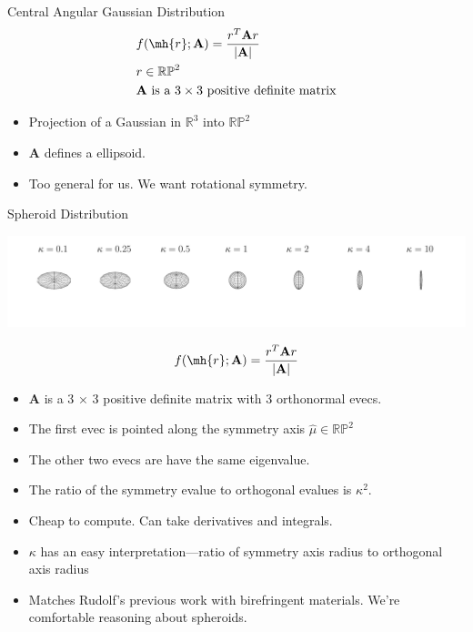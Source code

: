 \documentclass[presentation]{beamer}
\begin{document}
\begin{frame}[label=sec-3]{Central Angular Gaussian Distribution}
\begin{align*}
  &f(\mh{r}; \mathbf{A}) = \frac{r^T\mathbf{A}r}{|\mathbf{A}|}\\
  &r \in \mathbb{RP}^2\\
  &\mathbf{A}\ \text{is a}\ 3\times 3\ \text{positive definite matrix}
\end{align*}
\begin{itemize}
\item Projection of a Gaussian in $\mathbb{R}^3$ into $\mathbb{RP}^2$
\item $\mathbf{A}$ defines a ellipsoid.
\item Too general for us. We want rotational symmetry. 
\end{itemize}
\end{frame}
\begin{frame}[label=sec-4]{Spheroid Distribution}
\vspace{-1em}
\begin{center}
  \includegraphics[width=1.0\textwidth, interpolate=true]{figs/spheroid.pdf}
\end{center}
\vspace{-4em}
\begin{align*}
  f(\mh{r}; \mathbf{A}) = \frac{r^T\mathbf{A}r}{|\mathbf{A}|}
\end{align*}
\vspace{-1em}
\begin{itemize}
\item $\mathbf{A}$ is a 3 $\times$ 3 positive definite matrix with 3 orthonormal evecs.
\item The first evec is pointed along the symmetry axis $\hat{\mu} \in \mathbb{RP}^2$
\item The other two evecs are have the same eigenvalue. 
\item The ratio of the symmetry evalue to orthogonal evalues is $\kappa^2$. 
\item Cheap to compute. Can take derivatives and integrals.
\item $\kappa$ has an easy interpretation---ratio of symmetry axis radius to orthogonal axis radius
\item Matches Rudolf's previous work with birefringent materials. We're comfortable reasoning about spheroids. 
\end{itemize}
\end{frame}
\end{document}
